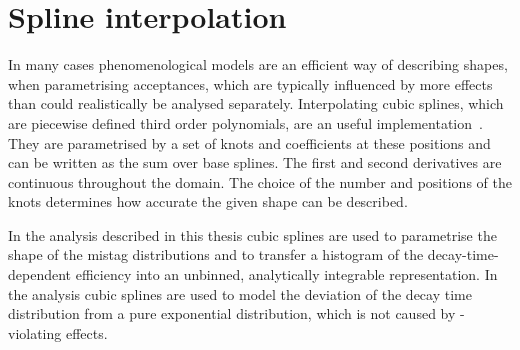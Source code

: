 
\section{Spline interpolation}
\label{sec:dataanalysis:splines}

In many cases phenomenological models are an efficient way of describing
shapes, \eg when parametrising acceptances, which are typically influenced by
more effects than could realistically be analysed separately. Interpolating
cubic splines, which are piecewise defined third order polynomials, are an
useful implementation~\cite{Splines}. They are parametrised by a set of knots
and coefficients at these positions and can be written as the sum over base
splines. The first and second derivatives are continuous throughout the
domain. The choice of the number and positions of the knots determines how
accurate the given shape can be described.

In the \BdToJPsiKS analysis described in this thesis cubic splines are used to
parametrise the shape of the mistag distributions and to transfer a histogram
of the decay-time-dependent efficiency into an unbinned, analytically
integrable representation. In the \BdToDD analysis cubic splines are used to
model the deviation of the decay time distribution from a pure exponential
distribution, which is not caused by \CP-violating effects.